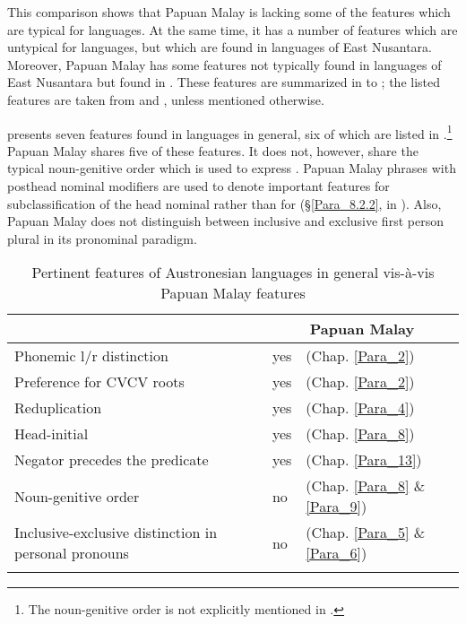 This comparison shows that Papuan Malay is lacking some of the features which are typical for  languages. At the same time, it has a number of features which are untypical for  languages, but which are found in  languages of East Nusantara. Moreover, Papuan Malay has some features not typically found in  languages of East Nusantara but found in . These features are summarized in  to ; the listed features are taken from \citet{Klamer.2008} and \citet{Klamer.2010}, unless mentioned otherwise.


\largerpage
{} presents seven features found in  languages in general, six of which are listed in {\citet[113]{Klamer.2008}}.\footnote{The noun-genitive order is not explicitly mentioned in {\citet{Klamer.2008}}.} Papuan Malay shares five of these features. It does not, however, share the typical noun-genitive order which is used to express . Papuan Malay  phrases with posthead nominal modifiers are used to denote important features for subclassification of the head nominal rather than for  (§\ref{Para_8.2.2}, in ). Also, Papuan Malay does not distinguish between inclusive and exclusive first person plural in its pronominal paradigm.


\begin{table}
\caption{Pertinent features of Austronesian languages in general vis-à-vis Papuan Malay features\label{Table_1.4}}
\begin{tabular}{lll}
\lsptoprule
 \multicolumn{1}{c}{\ili{Austronesian} languages} & \multicolumn{2}{c}{ Papuan Malay}\\
\midrule

Phonemic l/r distinction & yes & (Chap. \ref{Para_2})\\
 \tablevspace
Preference for CVCV roots & yes & (Chap. \ref{Para_2})\\
 \tablevspace
Reduplication & yes & (Chap. \ref{Para_4})\\
 \tablevspace
Head-initial & yes & (Chap. \ref{Para_8})\\
 \tablevspace
Negator precedes the predicate & yes & (Chap. \ref{Para_13})\\
 \tablevspace
Noun-genitive order & no & (Chap. \ref{Para_8} \& \ref{Para_9})\\
 \tablevspace
Inclusive-exclusive distinction in personal pronouns & no & (Chap. \ref{Para_5} \& \ref{Para_6})\\
\lspbottomrule
\end{tabular}
\end{table}

